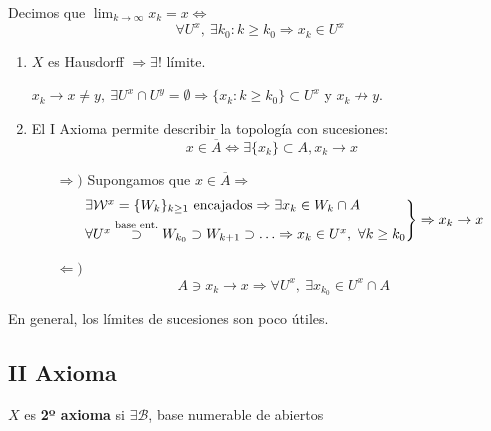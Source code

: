 \begin{defi}[Límites]
Decimos que $\lim_{k \rightarrow \infty} x_k = x \Leftrightarrow$ 
\[
\forall U^x,\ \exists k_0 : k \ge k_0 \Rightarrow x_k \in U^x
\]
\end{defi}
\begin{obs}
\begin{enumerate}
    \item $X$ es Hausdorff $\Rightarrow \exists! $ límite. 
    \begin{demo}    
    $x_k \rightarrow x \neq y,\ \exists U^x \cap U^y = \emptyset \Rightarrow \{x_k : k \ge k_0\} \subset U^x$ y $x_k \not \rightarrow y$.
    \end{demo}

    \item El I Axioma permite describir la topología con sucesiones:
    \[
     x \in \overline{A} \Leftrightarrow \exists \{x_k\} \subset A, x_k \rightarrow x
    \]

    \begin{demo}
    \begin{itemize}
        \item[$\Rightarrow)$] Supongamos que $x \in \overline{A} \Rightarrow$
        \[
        \begin{rcases}
            \exists \mathcal{W}^x = \{W_k\}_{k \ge 1} \text{ encajados} \Rightarrow \exists x_k \in W_k \cap A\\
            \forall U^x \stackrel{\text{base ent.}}{\supset} W_{k_0} \supset W_{k + 1} \supset \ldots \Rightarrow x_k \in U^x,\ \forall k \ge k_0  
        \end{rcases} \Rightarrow x_k \rightarrow x
        \]
        \item[$\Leftarrow)$]
        \[
        A \ni x_k \rightarrow x \Rightarrow \forall U^x,\ \exists x_{k_0} \in U^x \cap A
        \]
    \end{itemize}
    \end{demo}
\end{enumerate}
En general, los límites de sucesiones son poco útiles.
\end{obs}

\subsection{II Axioma}%
\label{sub:iiax}
\begin{defi}[II Ax.]
$X$ es \textbf{2º axioma} si $\exists \mathcal{B}$, base numerable de abiertos
\end{defi}

